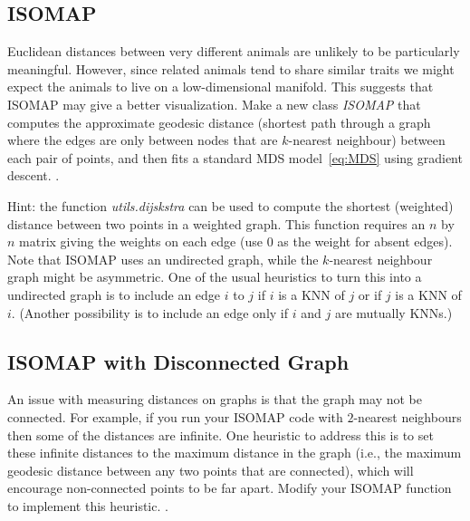 \documentclass{article}
\begin{document}
\subsection{ISOMAP}

Euclidean distances between very different animals are unlikely to be particularly meaningful. However, since related animals tend to share similar traits we might expect the animals to live on a low-dimensional manifold. This suggests that ISOMAP may give a better visualization. 
Make a new class \emph{ISOMAP} that computes the approximate geodesic distance (shortest path through a graph where the edges are only between nodes that are $k$-nearest neighbour) between each pair of points, and then fits a standard MDS model~\eqref{eq:MDS} using gradient descent. .

Hint: the function \emph{utils.dijskstra} can be used to compute the shortest (weighted) distance between two points in a weighted graph. This function requires an $n$ by $n$ matrix giving the weights on each edge (use $0$ as the weight for absent edges). Note that ISOMAP uses an undirected graph, while the $k$-nearest neighbour graph might be asymmetric. One of the usual heuristics to turn this into a undirected graph is to include an edge $i$ to $j$ if $i$ is a KNN of $j$ or if $j$ is a KNN of $i$. (Another possibility is to include an edge only if $i$ and $j$ are mutually KNNs.)

\subsection{ISOMAP with Disconnected Graph}

An issue with measuring distances on graphs is that the graph may not be connected. For example, if you run your ISOMAP code with $2$-nearest neighbours then some of the distances are infinite. One heuristic to address this is to set these infinite distances to the maximum distance in the graph (i.e., the maximum geodesic distance between any two points that are connected), which will encourage non-connected points to be far apart. Modify your ISOMAP function to implement this heuristic. .

\end{document}
